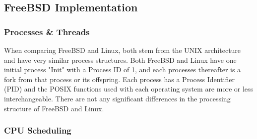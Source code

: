 \documentclass[draftclsnofoot, onecolumn, compsoc, 10pt]{IEEEtran}
\begin{document}
\subsection{FreeBSD Implementation}
\subsubsection{Processes \& Threads}

When comparing FreeBSD and Linux, both stem from the UNIX architecture and have very similar process structures. Both FreeBSD and Linux have one initial process "Init" with a Process ID of 1, and each processes thereafter is a fork from that process or its offspring. Each process has a Process Identifier (PID) and the POSIX functions used with each operating system are more or less interchangeable. There are not any significant differences in the processing structure of FreeBSD and Linux. 

\subsubsection{CPU Scheduling}
\end{document}
